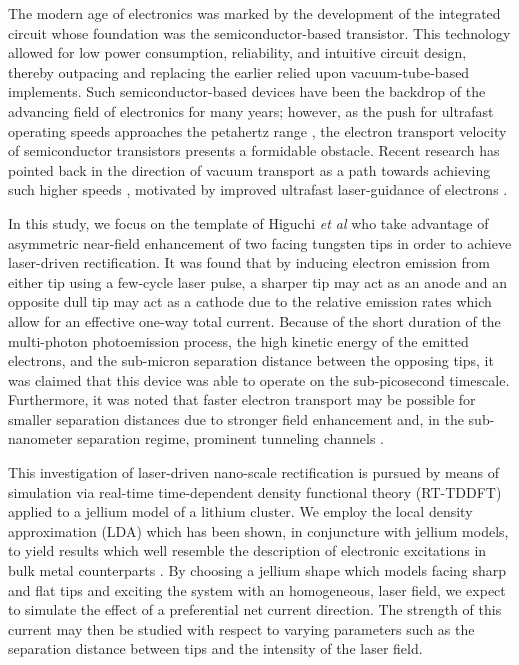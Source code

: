\documentclass[%
 reprint,
 amsmath,amssymb,
pra,
tightenlines
]{revtex4-1}
\begin{document}

The modern age of electronics was marked by the development of the integrated circuit whose foundation was the semiconductor-based transistor. This technology allowed for low power consumption, reliability, and intuitive circuit design, thereby outpacing and replacing the earlier relied upon vacuum-tube-based implements. Such semiconductor-based devices have been the backdrop of the advancing field of electronics for many years; however, as the push for ultrafast operating speeds approaches the petahertz range \cite{0034-4885-80-5-054401}, the electron transport velocity of semiconductor transistors presents a formidable obstacle. Recent research has pointed back in the direction of vacuum transport as a path towards achieving such higher speeds \cite{doi:10.1063/1.4907607,doi:10.1063/1.2944267,doi:10.1021/acs.nanolett.6b04363}, motivated by improved ultrafast laser-guidance of electrons \cite{Yoshioka2016,Kruger2011,Jelic2017,Rybka2016,doi:10.1063/1.4974529,Schiffrin2013,Jeon2016,doi:10.1063/1.4867185}. 

In this study, we focus on the template of Higuchi \textit{et al} \cite{doi:10.1063/1.4907607} who take advantage of asymmetric near-field enhancement of two facing tungsten tips in order to achieve laser-driven rectification. It was found that by inducing electron emission from either tip using a few-cycle laser pulse, a sharper tip may act as an anode and an opposite dull tip may act as a cathode due to the relative emission rates which allow for an effective one-way total current. Because of the short duration of the multi-photon photoemission process, the high kinetic energy of the emitted electrons, and the sub-micron separation distance between the opposing tips, it was claimed that this device was able to operate on the sub-picosecond timescale. Furthermore, it was noted that faster electron transport may be possible for smaller separation distances due to stronger field enhancement and, in the sub-nanometer separation regime, prominent tunneling channels \cite{Savage2012}.   


This investigation of laser-driven nano-scale rectification is pursued by means of simulation via real-time time-dependent density functional theory (RT-TDDFT) applied to a jellium model of a lithium cluster. We employ the local density approximation (LDA) which has been shown, in conjuncture with jellium models, to yield results which well resemble the description of electronic excitations in bulk metal counterparts \cite{PhysRevB.54.4484,PhysRevLett.52.1925,RevModPhys.65.677,PhysRevA.51.1327,doi:10.1021/nl803811g}. By choosing a jellium shape which models facing sharp and flat tips and exciting the system with an homogeneous, laser field, we expect to simulate the effect of a preferential net current direction. The strength of this current may then be studied with respect to varying parameters such as the separation distance between tips and the intensity of the laser field. 
\end{document}

